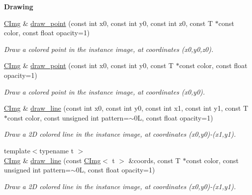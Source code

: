 \begin{Indent}{\bf Drawing}
\begin{DoxyCompactItemize}
\item 
\hyperlink{structcimg__library_1_1_c_img}{CImg} \& \hyperlink{structcimg__library_1_1_c_img_a2deae980ec7e42b63d680d39d7bb0e6d}{draw\_\-point} (const int x0, const int y0, const int z0, const T $\ast$const color, const float opacity=1)
\begin{DoxyCompactList}\small\item\em Draw a colored point in the instance image, at coordinates ({\ttfamily x0},{\ttfamily y0},{\ttfamily z0}). \item\end{DoxyCompactList}\item 
\hyperlink{structcimg__library_1_1_c_img}{CImg} \& \hyperlink{structcimg__library_1_1_c_img_a005b5dc96368f5dac4f0bf32619937f1}{draw\_\-point} (const int x0, const int y0, const T $\ast$const color, const float opacity=1)
\begin{DoxyCompactList}\small\item\em Draw a colored point in the instance image, at coordinates ({\ttfamily x0},{\ttfamily y0}). \item\end{DoxyCompactList}\item 
\hyperlink{structcimg__library_1_1_c_img}{CImg} \& \hyperlink{structcimg__library_1_1_c_img_ae4c023e05bb47d46dc752cdf1a39e0d1}{draw\_\-line} (const int x0, const int y0, const int x1, const int y1, const T $\ast$const color, const unsigned int pattern=$\sim$0L, const float opacity=1)
\begin{DoxyCompactList}\small\item\em Draw a 2D colored line in the instance image, at coordinates ({\ttfamily x0},{\ttfamily y0})-\/({\ttfamily x1},{\ttfamily y1}). \item\end{DoxyCompactList}\item 
{\footnotesize template$<$typename t $>$ }\\\hyperlink{structcimg__library_1_1_c_img}{CImg} \& \hyperlink{structcimg__library_1_1_c_img_a451c210d64a154b041632038addf061f}{draw\_\-line} (const \hyperlink{structcimg__library_1_1_c_img}{CImg}$<$ t $>$ \&coords, const T $\ast$const color, const unsigned int pattern=$\sim$0L, const float opacity=1)
\begin{DoxyCompactList}\small\item\em Draw a 2D colored line in the instance image, at coordinates ({\ttfamily x0},{\ttfamily y0})-\/({\ttfamily x1},{\ttfamily y1}). \item\end{DoxyCompactList}\item 

\end{DoxyCompactItemize}
\end{Indent}
